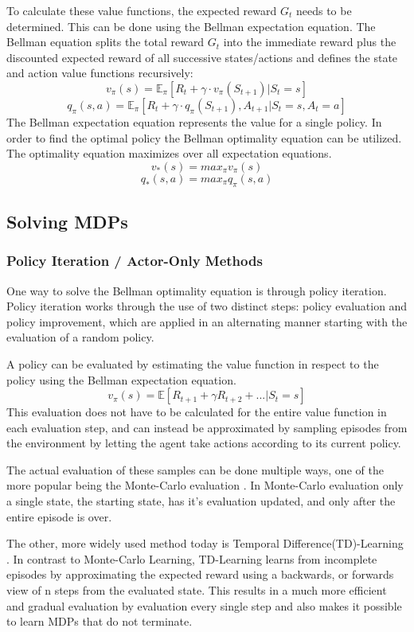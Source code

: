 To calculate these value functions, the expected reward $G_t$ needs to be determined. This can be done using the Bellman expectation equation. The Bellman equation splits the total reward $G_t$ into the immediate reward plus the discounted expected reward of all successive states/actions and defines the state and action value functions recursively:
$$v_\pi(s) = \mathbb{E}_\pi[R_t + \gamma \cdot v_\pi(S_{t+1}) | S_t = s]$$
$$q_\pi(s, a) = \mathbb{E}_\pi[R_t + \gamma \cdot q_\pi(S_{t+1}), A_{t+1} | S_t = s, A_t = a]$$
The Bellman expectation equation represents the value for a single policy. 
In order to find the optimal policy the Bellman optimality equation can be utilized. 
The optimality equation maximizes over all expectation equations.
$$v_*(s)= max_\pi v_\pi(s)$$
$$q_*(s, a) = max_\pi q_\pi(s, a)$$

\subsection{Solving MDPs}

\subsubsection{Policy Iteration / Actor-Only Methods}
\label{sec:pollearning}
One way to solve the Bellman optimality equation is through policy iteration. Policy iteration works through the use of two distinct steps: policy evaluation and policy improvement, which are applied in an alternating manner starting with the evaluation of a random policy.

A policy can be evaluated by estimating the value function in respect to the policy using the Bellman expectation equation.
$$v_\pi(s) = \mathbb{E}[R_{t+1} + \gamma R_{t+2} + ... | S_t = s]$$
This evaluation does not have to be calculated for the entire value function in each evaluation step, and can instead be approximated by sampling episodes from the environment by letting the agent take actions according to its current policy.

The actual evaluation of these samples can be done multiple ways, one of the more popular being the Monte-Carlo evaluation \citep{DBLP:conf/wsc/CerdaF97}. In Monte-Carlo evaluation only a single state, the starting state, has it's evaluation updated, and only after the entire episode is over. 

The other, more widely used method today is Temporal Difference(TD)-Learning \citep{DBLP:journals/ml/Sutton88}. In contrast to Monte-Carlo Learning, TD-Learning learns from incomplete episodes by approximating the expected reward using a backwards, or forwards view of n steps from the evaluated state. This results in a much more efficient and gradual evaluation by evaluation every single step and also makes it possible to learn MDPs that do not terminate. 


